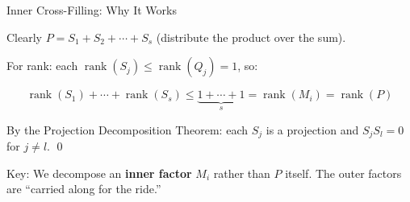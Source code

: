 \documentclass[10pt]{beamer}
\theoremstyle{definition}
\newcommand{\x}[1]{\alert{\textbf{#1}}}
\begin{document}
\begin{frame}{Inner Cross-Filling: Why It Works}

Clearly $P = S_1 + S_2 + \cdots + S_s$ (distribute the product over the sum).

\vspace{0.5em}

For rank: each $\operatorname{rank}(S_j) \leq \operatorname{rank}(Q_j) = 1$, so:

$$\operatorname{rank}(S_1) + \cdots + \operatorname{rank}(S_s) \leq \underbrace{1 + \cdots + 1}_{s} = \operatorname{rank}(M_i) = \operatorname{rank}(P)$$

\vspace{0.5em}

By the Projection Decomposition Theorem: each $S_j$ is a projection and $S_j S_l = 0$ for $j \neq l$. \qed

\vspace{0.5em}

Key: We decompose an \x{inner factor} $M_i$ rather than $P$ itself. The outer factors are ``carried along for the ride.''

\end{frame}
\end{document}
